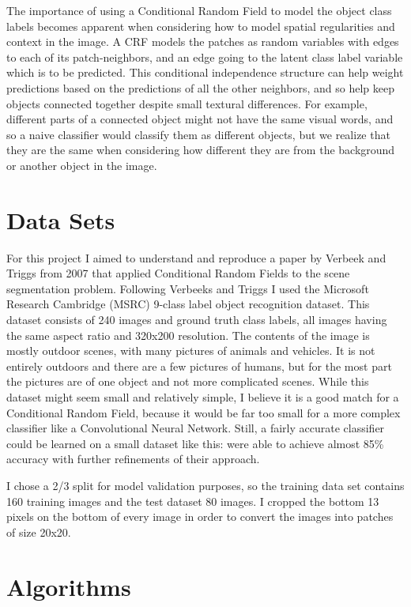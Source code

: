\documentclass{article}
\begin{document}
The importance of using a Conditional Random Field to model the object class labels becomes apparent when considering how to model spatial regularities and context in the image. A CRF models the patches as random variables with edges to each of its patch-neighbors, and an edge going to the latent class label variable which is to be predicted. This conditional independence structure can help weight predictions based on the predictions of all the other neighbors, and so help keep objects connected together despite small textural differences. For example, different parts of a connected object might not have the same visual words, and so a naive classifier would classify them as different objects, but we realize that they are the same when considering how different they are from the background or another object in the image.

\section{Data Sets}

For this project I aimed to understand and reproduce a paper by Verbeek and
Triggs from 2007 that applied Conditional Random Fields to the
scene segmentation problem. Following Verbeeks and Triggs I used the Microsoft Research Cambridge (MSRC) 9-class label object recognition dataset. This dataset consists of 240 images and ground truth class labels, all images having the same aspect ratio and 320x200 resolution. The contents of the image is mostly outdoor scenes, with many pictures of animals and vehicles. It is not entirely outdoors and there are a few pictures of humans, but for the most part the pictures are of one object and not more complicated scenes. While this dataset might seem small and relatively simple, I believe it is a good match for a Conditional Random Field, because it would be far too small for a more complex classifier like a Convolutional Neural Network. Still, a fairly accurate classifier could be learned on a small dataset like this: \cite{VT} were able to achieve almost 85\% accuracy with further refinements of their approach.

I chose a 2/3 split for model validation purposes, so the training data set contains 160 training images and the test dataset 80 images. I cropped the bottom 13 pixels on the bottom of every image in order to convert the images into patches of size 20x20.

\section{Algorithms} 
\end{document}
